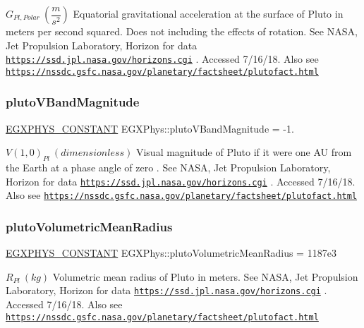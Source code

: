 $ G_{Pl,Polar} \ (\dfrac{m}{s^2})$ Equatorial gravitational acceleration at the surface of Pluto in meters per second squared. Does not including the effects of rotation. See N\+A\+SA, Jet Propulsion Laboratory, Horizon for data \href{https://ssd.jpl.nasa.gov/horizons.cgi}{\tt https\+://ssd.\+jpl.\+nasa.\+gov/horizons.\+cgi} . Accessed 7/16/18. Also see \href{https://nssdc.gsfc.nasa.gov/planetary/factsheet/plutofact.html}{\tt https\+://nssdc.\+gsfc.\+nasa.\+gov/planetary/factsheet/plutofact.\+html} \mbox{\label{group___e_g_x_phys-_constants-_astrophysics-_solar_system-_pluto-_bulk_gaed84c83982a2343b562c9c7f82b81aa2}} 
\subsubsection{\texorpdfstring{pluto\+V\+Band\+Magnitude}{plutoVBandMagnitude}}
{\footnotesize\ttfamily \mbox{\hyperlink{group___e_g_x_phys-_constants-_macros_ga76980d288494ce1714c9ac68a95ba702}{E\+G\+X\+P\+H\+Y\+S\+\_\+\+C\+O\+N\+S\+T\+A\+NT}} E\+G\+X\+Phys\+::pluto\+V\+Band\+Magnitude = -\/1.}

$ V(1,0)_{Pl} \ (dimensionless)$ Visual magnitude of Pluto if it were one AU from the Earth at a phase angle of zero . See N\+A\+SA, Jet Propulsion Laboratory, Horizon for data \href{https://ssd.jpl.nasa.gov/horizons.cgi}{\tt https\+://ssd.\+jpl.\+nasa.\+gov/horizons.\+cgi} . Accessed 7/16/18. Also see \href{https://nssdc.gsfc.nasa.gov/planetary/factsheet/plutofact.html}{\tt https\+://nssdc.\+gsfc.\+nasa.\+gov/planetary/factsheet/plutofact.\+html} \mbox{\label{group___e_g_x_phys-_constants-_astrophysics-_solar_system-_pluto-_bulk_gad9e756e24608ecdfcf0dd0b21edf00f0}} 
\subsubsection{\texorpdfstring{pluto\+Volumetric\+Mean\+Radius}{plutoVolumetricMeanRadius}}
{\footnotesize\ttfamily \mbox{\hyperlink{group___e_g_x_phys-_constants-_macros_ga76980d288494ce1714c9ac68a95ba702}{E\+G\+X\+P\+H\+Y\+S\+\_\+\+C\+O\+N\+S\+T\+A\+NT}} E\+G\+X\+Phys\+::pluto\+Volumetric\+Mean\+Radius = 1187e3}

$R_{Pl} \ (kg)$ Volumetric mean radius of Pluto in meters. See N\+A\+SA, Jet Propulsion Laboratory, Horizon for data \href{https://ssd.jpl.nasa.gov/horizons.cgi}{\tt https\+://ssd.\+jpl.\+nasa.\+gov/horizons.\+cgi} . Accessed 7/16/18. Also see \href{https://nssdc.gsfc.nasa.gov/planetary/factsheet/plutofact.html}{\tt https\+://nssdc.\+gsfc.\+nasa.\+gov/planetary/factsheet/plutofact.\+html} 